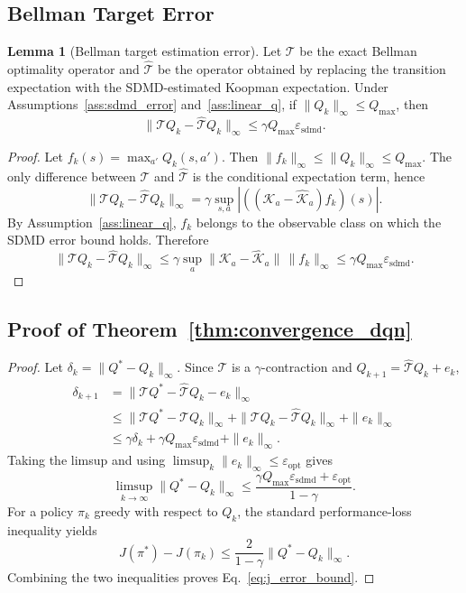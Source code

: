 \documentclass{article}
\numberwithin{equation}{section}
\theoremstyle{definition}
\newtheorem{lemma}[theorem]{Lemma}
\begin{document}
\subsection{Bellman Target Error}\label{lemmapf:q_target_error}
\begin{lemma}[Bellman target estimation error]\label{lemma:q_target_error}
Let $\mathcal{T}$ be the exact Bellman optimality operator and $\widehat{\mathcal{T}}$ be the operator obtained by replacing the transition expectation with the SDMD-estimated Koopman expectation. Under Assumptions~\ref{ass:sdmd_error} and~\ref{ass:linear_q}, if $\|Q_k\|_\infty\le Q_{\max}$, then
\begin{equation*}
\|\mathcal{T}Q_k-\widehat{\mathcal{T}}Q_k\|_\infty
\le
\gamma Q_{\max}\varepsilon_{\mathrm{sdmd}}.
\end{equation*}
\end{lemma}

\begin{proof}
Let $f_k(s)=\max_{a'}Q_k(s,a')$. Then $\|f_k\|_\infty\le\|Q_k\|_\infty\le Q_{\max}$. The only difference between $\mathcal{T}$ and $\widehat{\mathcal{T}}$ is the conditional expectation term, hence
\[
\|\mathcal{T}Q_k-\widehat{\mathcal{T}}Q_k\|_\infty
=\gamma\sup_{s,a}\left|((\mathcal{K}_a-\widehat{\mathcal{K}}_a)f_k)(s)\right|.
\]
By Assumption~\ref{ass:linear_q}, $f_k$ belongs to the observable class on which the SDMD error bound holds. Therefore
\[
\|\mathcal{T}Q_k-\widehat{\mathcal{T}}Q_k\|_\infty
\le
\gamma\sup_a\|\mathcal{K}_a-\widehat{\mathcal{K}}_a\|\,\|f_k\|_\infty
\le
\gamma Q_{\max}\varepsilon_{\mathrm{sdmd}}.
\]
\end{proof}

\subsection{Proof of Theorem~\ref{thm:convergence_dqn}}\label{thmpf:convergence_dqn}
\begin{proof}
Let $\delta_k=\|Q^*-Q_k\|_\infty$. Since $\mathcal{T}$ is a $\gamma$-contraction and $Q_{k+1}=\widehat{\mathcal{T}}Q_k+e_k$,
\[
\begin{aligned}
\delta_{k+1}
&=\|\mathcal{T}Q^*-\widehat{\mathcal{T}}Q_k-e_k\|_\infty\\
&\le \|\mathcal{T}Q^*-\mathcal{T}Q_k\|_\infty
+\|\mathcal{T}Q_k-\widehat{\mathcal{T}}Q_k\|_\infty
+\|e_k\|_\infty\\
&\le \gamma\delta_k+\gamma Q_{\max}\varepsilon_{\mathrm{sdmd}}+\|e_k\|_\infty.
\end{aligned}
\]
Taking the limsup and using $\limsup_k\|e_k\|_\infty\le\varepsilon_{\mathrm{opt}}$ gives
\[
\limsup_{k\to\infty}\|Q^*-Q_k\|_\infty
\le
\frac{\gamma Q_{\max}\varepsilon_{\mathrm{sdmd}}+\varepsilon_{\mathrm{opt}}}{1-\gamma}.
\]
For a policy $\pi_k$ greedy with respect to $Q_k$, the standard performance-loss inequality yields
\[
J(\pi^*)-J(\pi_k)
\le
\frac{2}{1-\gamma}\|Q^*-Q_k\|_\infty.
\]
Combining the two inequalities proves Eq.~\eqref{eq:j_error_bound}.
\end{proof}
\end{document}

